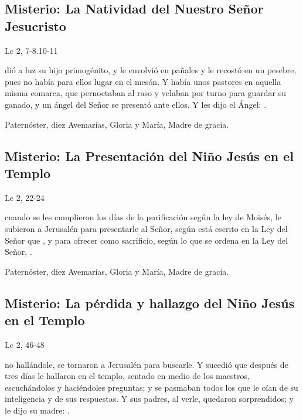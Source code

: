 \documentclass[10pt,a4paper,oneside]{book}
\newcounter{joyful-counter}
\begin{document}
\subsection*{ Misterio: La Natividad del Nuestro Señor Jesucristo}
\begin{flushright}
      {\color{red}Lc 2, 7-8.10-11}
\end{flushright}
 dió a luz su hijo primogénito, y le envolvió en pañales y le recostó en un pesebre, pues no había para ellos lugar en el mesón.
Y había unos pastores en aquella misma comarca, que pernoctaban al raso y velaban por turno para guardar su ganado, y un ángel del Señor se presentó ante ellos.
Y les dijo el Ángel: .

\begin{center}
      Paternóster, diez Avemarías, Gloria y María, Madre de gracia.
\end{center}

\subsection*{ Misterio: La Presentación del Niño Jesús en el Templo}
\begin{flushright}
      {\color{red}Lc 2, 22-24}
\end{flushright}
 cuando se les cumplieron los días de la purificación según la ley de Moisés, le subieron a Jerusalén para presentarle al Señor,
según está escrito en la Ley del Señor que , y para ofrecer como sacrificio,
según lo que se ordena en la Ley del Señor, .

\begin{center}
      Paternóster, diez Avemarías, Gloria y María, Madre de gracia.
\end{center}

\subsection*{ Misterio: La pérdida y hallazgo del Niño Jesús en el Templo}
\begin{flushright}
      {\color{red}Lc 2, 46-48}
\end{flushright}
 no hallándole, se tornaron a Jerusalén para buscarle. Y sucedió que después de tres días le hallaron en el templo,
sentado en medio de los maestros, escuchándolos y haciéndoles preguntas; y se pasmaban todos los que le oían de su inteligencia y de sus respuestas.
Y sus padres, al verle, quedaron sorprendidos; y le dijo su madre: .
\end{document}
